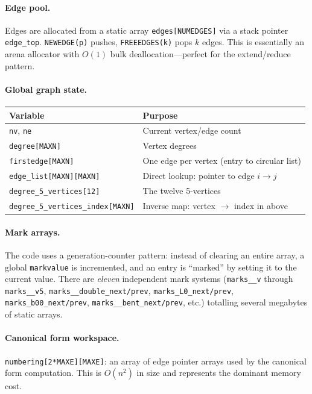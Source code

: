 \documentclass[11pt,a4paper]{article}
\theoremstyle{definition}
\begin{document}
\paragraph{Edge pool.}
Edges are allocated from a static array \texttt{edges[NUMEDGES]} via a
stack pointer \texttt{edge\_top}.  \texttt{NEWEDGE(p)} pushes,
\texttt{FREEEDGES(k)} pops $k$ edges.  This is essentially an arena
allocator with $O(1)$ bulk deallocation---perfect for the
extend/reduce pattern.

\paragraph{Global graph state.}
\begin{center}
\begin{tabular}{ll}
Variable & Purpose \\
\hline
\texttt{nv}, \texttt{ne} & Current vertex/edge count \\
\texttt{degree[MAXN]} & Vertex degrees \\
\texttt{firstedge[MAXN]} & One edge per vertex (entry to circular list) \\
\texttt{edge\_list[MAXN][MAXN]} & Direct lookup: pointer to edge $i \to j$ \\
\texttt{degree\_5\_vertices[12]} & The twelve 5-vertices \\
\texttt{degree\_5\_vertices\_index[MAXN]} & Inverse map: vertex $\to$ index in above \\
\end{tabular}
\end{center}

\paragraph{Mark arrays.}
The code uses a generation-counter pattern: instead of clearing an
entire array, a global \texttt{markvalue} is incremented, and an entry
is ``marked'' by setting it to the current value.  There are
\emph{eleven} independent mark systems (\texttt{marks\_\_v} through
\texttt{marks\_\_v5}, \texttt{marks\_\_double\_next/prev},
\texttt{marks\_L0\_next/prev}, \texttt{marks\_b00\_next/prev},
\texttt{marks\_\_bent\_next/prev}, etc.) totalling several megabytes
of static arrays.

\paragraph{Canonical form workspace.}
\texttt{numbering[2*MAXE][MAXE]}: an array of edge pointer arrays used
by the canonical form computation.  This is $O(n^2)$ in size and
represents the dominant memory cost.
\end{document}
